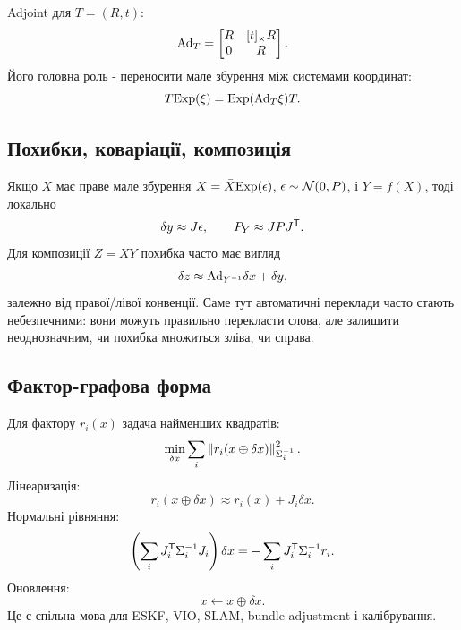 Adjoint для $T=(R,t)$:
\begin{equation}
 \mathrm{Ad}_T=\begin{bmatrix}R&[t]_{\times}R\\0&R\end{bmatrix}.
\end{equation}
Його головна роль - переносити мале збурення між системами координат:
\begin{equation}
 T\mathrm{Exp}(\xi)=\mathrm{Exp}(\mathrm{Ad}_T\xi)T.
\end{equation}

\subsection{Похибки, коваріації, композиція}

Якщо $X$ має праве мале збурення $X=\bar X\mathrm{Exp}(\epsilon)$, $\epsilon\sim\mathcal{N}(0,P)$, і $Y=f(X)$, тоді локально
\begin{equation}
 \delta y \approx J\epsilon,
 \qquad P_Y\approx JPJ^{\mathsf T}.
\end{equation}
Для композиції $Z=XY$ похибка часто має вигляд
\begin{equation}
 \delta z \approx \mathrm{Ad}_{Y^{-1}}\delta x + \delta y,
\end{equation}
залежно від правої/лівої конвенції. Саме тут автоматичні переклади часто стають небезпечними: вони можуть правильно перекласти слова, але залишити неоднозначним, чи похибка множиться зліва, чи справа.

\subsection{Фактор-графова форма}

Для фактору $r_i(x)$ задача найменших квадратів:
\begin{equation}
 \min_{\delta x}\sum_i \left\lVert r_i(x\oplus\delta x)\right\rVert^2_{\Sigma_i^{-1}}.
\end{equation}
Лінеаризація:
\begin{equation}
 r_i(x\oplus\delta x)\approx r_i(x)+J_i\delta x.
\end{equation}
Нормальні рівняння:
\begin{equation}
 \left(\sum_i J_i^{\mathsf T}\Sigma_i^{-1}J_i\right)\delta x
 = -\sum_i J_i^{\mathsf T}\Sigma_i^{-1}r_i.
\end{equation}
Оновлення:
\begin{equation}
 x\leftarrow x\oplus\delta x.
\end{equation}
Це є спільна мова для ESKF, VIO, SLAM, bundle adjustment і калібрування.
